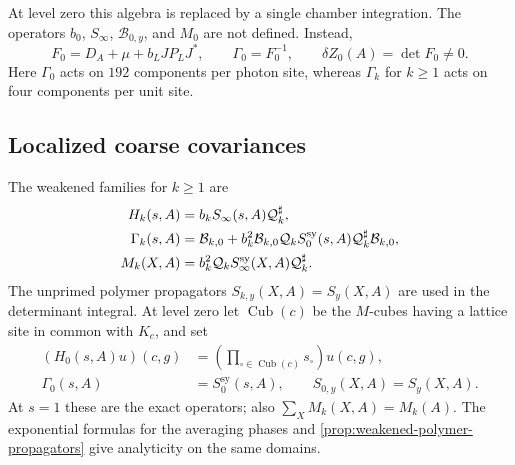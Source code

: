 At level zero this algebra is replaced by a single chamber
integration. The operators $b_0$, $S_\infty$, $\mathcal B_{0,y}$, and
$M_0$ are not defined. Instead,
\begin{equation}\label{eq:level-zero-covariance}
 F_0=D_A+\mu+b_LJP_LJ^*,\qquad
 \Gamma_0=F_0^{-1},\qquad \delta Z_0(A)=\det F_0\ne0.
\end{equation}
Here $\Gamma_0$ acts on $192$ components per photon site, whereas
$\Gamma_k$ for $k\ge1$ acts on four components per unit site.

\subsection{Localized coarse covariances}\label{subsec:localized-coarse-covariance}

The weakened families for $k\ge1$ are
\begin{align}
 H_k(s,A)&=b_kS_\infty(s,A)\mathcal Q_k^\sharp,
                                          \label{eq:local-coarse-families}\\
 \Gamma_k(s,A)&=\mathcal B_{k,0}
    +b_k^2\mathcal B_{k,0}\mathcal Q_kS_0^{\mathrm{sy}}(s,A)
                 \mathcal Q_k^\sharp\mathcal B_{k,0},\notag\\
 M_k(X,A)&=b_k^2\mathcal Q_kS_\infty^{\mathrm{sy}}(X,A)
                  \mathcal Q_k^\sharp.\notag
\end{align}
The unprimed polymer propagators $S_{k,y}(X,A)=S_y(X,A)$ are used
in the determinant integral. At level zero let
$\operatorname{Cub}(c)$ be the $M$-cubes having a lattice site in
common with $K_c$, and set
\begin{equation}\label{eq:local-level-zero-families}
 \begin{aligned}
 (H_0(s,A)u)(c,g)&=
       \left(\prod_{\square\in\operatorname{Cub}(c)}s_\square\right)u(c,g),\\
 \Gamma_0(s,A)&=S_0^{\mathrm{sy}}(s,A),\qquad
 S_{0,y}(X,A)=S_y(X,A).
 \end{aligned}
\end{equation}
At $s=1$ these are the exact operators; also
$\sum_XM_k(X,A)=M_k(A)$. The exponential formulas for the averaging
phases and \cref{prop:weakened-polymer-propagators} give
analyticity on the same domains.

